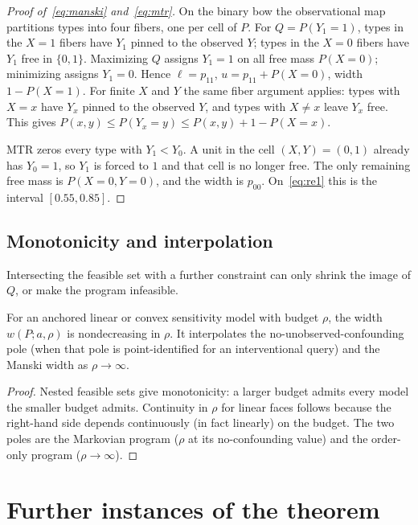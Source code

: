 \begin{proof}[Proof of~\eqref{eq:manski} and~\eqref{eq:mtr}]
On the binary bow the observational map partitions types into four
fibers, one per cell of $P$. For $Q=P(Y_1{=}1)$, types in the
$X{=}1$ fibers have $Y_1$ pinned to the observed $Y$; types in the
$X{=}0$ fibers have $Y_1$ free in $\{0,1\}$. Maximizing $Q$ assigns
$Y_1{=}1$ on all free mass $P(X{=}0)$; minimizing assigns $Y_1{=}0$.
Hence $\ell=p_{11}$, $u=p_{11}+P(X{=}0)$, width $1-P(X{=}1)$. For finite
$X$ and $Y$ the same fiber argument applies: types with $X=x$ have $Y_x$
pinned to the observed $Y$, and types with $X\neq x$ leave $Y_x$ free. This
gives $P(x,y)\le P(Y_x{=}y)\le P(x,y)+1-P(X{=}x)$.

MTR zeros every type with $Y_1<Y_0$. A unit in the cell
$(X,Y)=(0,1)$ already has $Y_0{=}1$, so $Y_1$ is forced to $1$ and
that cell is no longer free. The only remaining free mass is
$P(X{=}0,Y{=}0)$, and the width is $p_{00}$. On~\eqref{eq:re1} this
is the interval $[0.55,0.85]$.
\end{proof}

\subsection{Monotonicity and interpolation}
\label{app:mono}

Intersecting the feasible set with a further constraint can only shrink
the image of $Q$, or make the program infeasible.

\begin{corollary}
\label{cor:interp}
For an anchored linear or convex sensitivity model with budget
$\rho$, the width $w(P;a,\rho)$ is nondecreasing in $\rho$. It
interpolates the no-unobserved-confounding pole (when that pole is
point-identified for an interventional query) and the Manski width as
$\rho\to\infty$.
\end{corollary}

\begin{proof}
Nested feasible sets give monotonicity: a larger budget admits every
model the smaller budget admits.
Continuity in $\rho$ for linear faces follows because the
right-hand side depends continuously (in fact linearly) on the
budget. The two poles are the Markovian program ($\rho$ at its
no-confounding value) and the order-only program ($\rho\to\infty$).
\end{proof}

\clearpage
\section{Further instances of the theorem}
\label{sec:instances}

